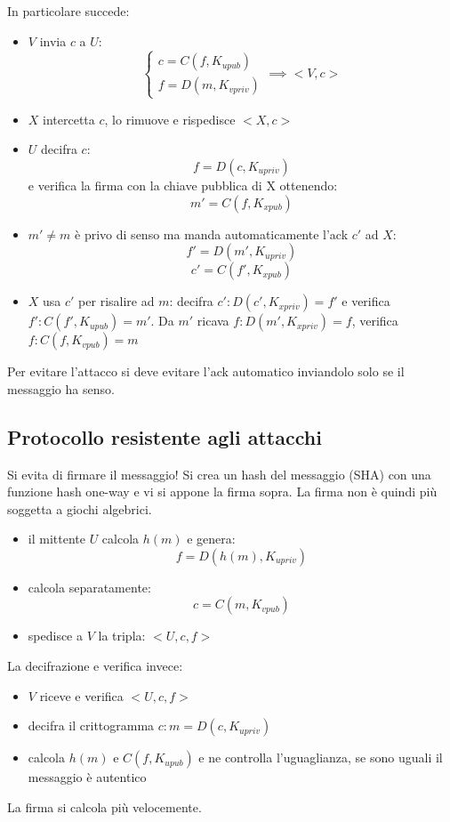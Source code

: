 In particolare succede:
\begin{itemize}
    \item $V$ invia $c$ a $U$:
        \begin{equation}
            \begin{cases}
                c = C(f, K_{upub}) \\
                f = D(m, K_{vpriv})
            \end{cases}
            \implies <V,c>
        \end{equation}
    \item $X$ intercetta $c$, lo rimuove e rispedisce $<X,c>$
    \item $U$ decifra $c$:
    $$ f = D(c, K_{upriv}) $$
    e verifica la firma con la chiave pubblica di X ottenendo:
    $$ m' = C(f, K_{xpub}) $$
    \item $m' \neq m$ è privo di senso ma manda automaticamente l'ack $c'$ ad $X$:
    $$ f' = D(m', K_{upriv}) $$
    $$ c' = C(f', K_{xpub}) $$
    \item $X$ usa $c'$ per risalire ad $m$: decifra $c': D(c', K_{xpriv}) = f'$ e verifica $f': C(f', K_{upub}) = m'$. Da $m'$ ricava $f: D(m', K_{xpriv})=f$, verifica $f: C(f, K_{vpub}) = m$
\end{itemize}

Per evitare l'attacco si deve evitare l'ack automatico inviandolo solo se il messaggio ha senso.

\subsection{Protocollo resistente agli attacchi}
Si evita di firmare il messaggio!
Si crea un hash del messaggio (SHA) con una funzione hash one-way e vi si appone la firma sopra.
La firma non è quindi più soggetta a giochi algebrici.
\begin{itemize}
    \item il mittente $U$ calcola $h(m)$ e genera:
    $$ f = D(h(m), K_{upriv})$$
    \item calcola separatamente:
    $$ c = C(m, K_{vpub}) $$
    \item spedisce a $V$ la tripla: $<U, c, f>$
\end{itemize}

La decifrazione e verifica invece:
\begin{itemize}
    \item $V$ riceve e verifica $<U, c, f>$
    \item decifra il crittogramma $c: m = D(c, K_{upriv})$
    \item calcola $h(m)$ e $C(f, K_{upub})$ e ne controlla l'uguaglianza, se sono uguali il messaggio è autentico
\end{itemize}
La firma si calcola più velocemente.

